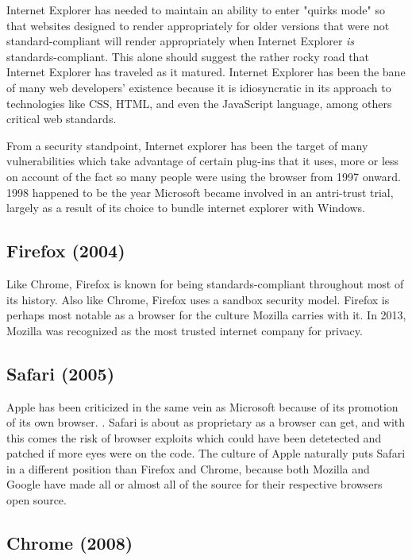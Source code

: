 \documentclass[a4paper, 11pt]{article} %
\begin{document}
Internet Explorer has needed to maintain an ability to enter "quirks mode" so that websites designed to render appropriately for older versions that were not standard-compliant will render appropriately when Internet Explorer \textit{is} standards-compliant. This alone should suggest the rather rocky road that Internet Explorer has traveled as it matured. Internet Explorer has been the bane of many web developers' existence because it is idiosyncratic in its approach to technologies like CSS, HTML, and even the JavaScript language, among others critical web standards.

From a security standpoint, Internet explorer has been the target of many vulnerabilities which take advantage of certain plug-ins that it uses, more or less on account of the fact so many people were using the browser from 1997 onward. 1998 happened to be the year Microsoft became involved in an antri-trust trial, largely as a result of its choice to bundle internet explorer with Windows. \cite{Inter45:online}

\subsection{Firefox (2004)}

Like Chrome, Firefox is known for being standards-compliant throughout most of its history. Also like Chrome, Firefox uses a sandbox security model. Firefox is perhaps most notable as a browser for the culture Mozilla carries with it. In 2013, Mozilla was recognized as the most trusted internet company for privacy. \cite{Mozil33:online}

\subsection{Safari (2005)}

Apple has been criticized in the same vein as Microsoft because of its promotion of its own browser. \cite{Mozil34:online}. Safari is about as proprietary as a browser can get, and with this comes the risk of browser exploits which could have been detetected and patched if more eyes were on the code. \cite{brows80:online} The culture of Apple naturally puts Safari in a different position than Firefox and Chrome, because both Mozilla and Google have made all or almost all of the source for their respective browsers open source. \cite{Googl14:online}

\subsection{Chrome (2008)}
\end{document}
